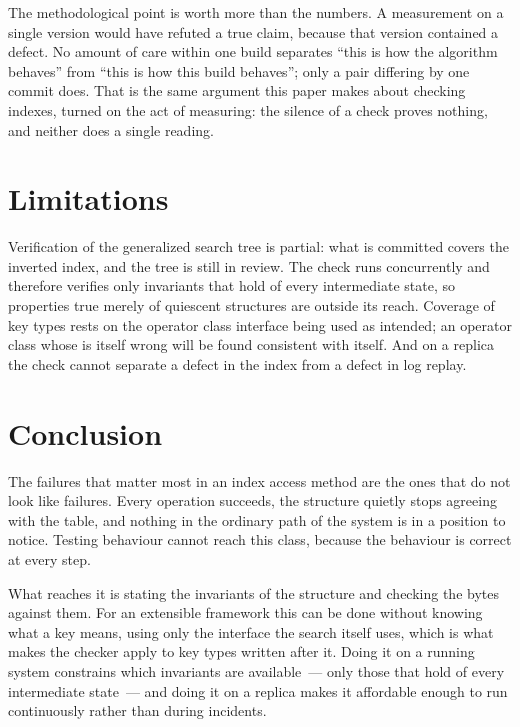 The methodological point is worth more than the numbers. A measurement on a
single version would have refuted a true claim, because that version contained a
defect. No amount of care within one build separates ``this is how the algorithm
behaves'' from ``this is how this build behaves''; only a pair differing by one
commit does. That is the same argument this paper makes about checking indexes,
turned on the act of measuring: the silence of a check proves nothing, and
neither does a single reading.


\section{Limitations}

Verification of the generalized search tree is partial: what is committed covers
the inverted index, and the tree is still in review. The check runs concurrently
and therefore verifies only invariants that hold of every intermediate state, so
properties true merely of quiescent structures are outside its reach. Coverage of
key types rests on the operator class interface being used as intended; an
operator class whose  is itself wrong will be found consistent
with itself. And on a replica the check cannot separate a defect in the index
from a defect in log replay.

\section{Conclusion}

The failures that matter most in an index access method are the ones that do not
look like failures. Every operation succeeds, the structure quietly stops
agreeing with the table, and nothing in the ordinary path of the system is in a
position to notice. Testing behaviour cannot reach this class, because the
behaviour is correct at every step.

What reaches it is stating the invariants of the structure and checking the bytes
against them. For an extensible framework this can be done without knowing what a
key means, using only the interface the search itself uses, which is what makes
the checker apply to key types written after it. Doing it on a running system
constrains which invariants are available~--- only those that hold of every
intermediate state~--- and doing it on a replica makes it affordable enough to
run continuously rather than during incidents.

